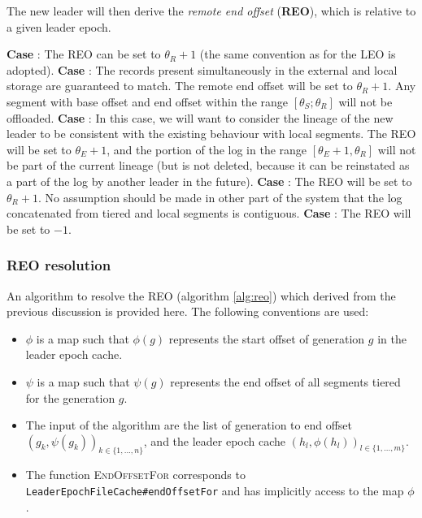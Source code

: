 \documentclass{article}
\newcommand*\circled[1]{\tikz[baseline=(char.base)]{
		\node[shape=circle,draw,inner sep=1pt] (char) {#1};}}
\begin{document}
The new leader will then derive the \textit{remote end offset} (\textbf{REO}), which is relative to a given leader epoch.

\begin{outline}[enumerate]
	\1 \textbf{Case \circled{A}}: The REO can be set to $\theta_R + 1$ (the same convention as for the LEO is adopted).
	\1 \textbf{Case \circled{B}}: The records present simultaneously in the external and local storage are guaranteed to match. The remote end offset will be set to $\theta_R + 1$. Any segment with base offset and end offset within the range $[\theta_S; \theta_R]$ will not be offloaded.
	\1 \textbf{Case \circled{C}}: In this case, we will want to consider the lineage of the new leader to be consistent with the existing behaviour with local segments. The REO will be set to $\theta_E + 1$, and the portion of the log in the range $[\theta_E + 1, \theta_R]$ will not be part of the current lineage (but is not deleted, because it can be reinstated as a part of the log by another leader in the future).
	\1 \textbf{Case \circled{D}}: The REO will be set to $\theta_R + 1$. No assumption should be made in other part of the system that the log concatenated from tiered and local segments is contiguous.
	\1 \textbf{Case \circled{E}}: The REO will be set to $-1$.
\end{outline}

\subsubsection{REO resolution}

An algorithm to resolve the REO (algorithm \ref{alg:reo}) which derived from the previous discussion is provided here. The following conventions are used:

\begin{itemize}
	\item $\phi$ is a map such that $\phi(g)$ represents the start offset of generation $g$ in the leader epoch cache.
	\item $\psi$ is a map such that $\psi(g)$ represents the end offset of all segments tiered for the generation $g$.
	\item The input of the algorithm are the list of generation to end offset $(g_k, \psi(g_k))_{k \in \{1,...,n\}}$, and the leader epoch cache $(h_l, \phi(h_l))_{l \in \{1,...,m\}}$.
	\item The function \textsc{EndOffsetFor} corresponds to \texttt{LeaderEpochFileCache\#endOffsetFor} and has implicitly access to the map $\phi$.
\end{itemize} 
\end{document}

